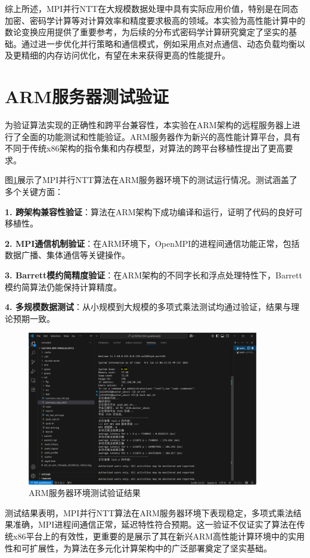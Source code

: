 \documentclass[a4paper]{article}
\begin{document}
\vspace{0.5em}
综上所述，MPI并行NTT在大规模数据处理中具有实际应用价值，特别是在同态加密、密码学计算等对计算效率和精度要求极高的领域。本实验为高性能计算中的数论变换应用提供了重要参考，为后续的分布式密码学计算研究奠定了坚实的基础。通过进一步优化并行策略和通信模式，例如采用点对点通信、动态负载均衡以及更精细的内存访问优化，有望在未来获得更高的性能提升。

\newpage
\appendix
\section{ARM服务器测试验证}

为验证算法实现的正确性和跨平台兼容性，本实验在ARM架构的远程服务器上进行了全面的功能测试和性能验证。ARM服务器作为新兴的高性能计算平台，具有不同于传统x86架构的指令集和内存模型，对算法的跨平台移植性提出了更高要求。

图\ref{fig:server_test}展示了MPI并行NTT算法在ARM服务器环境下的测试运行情况。测试涵盖了多个关键方面：

\textbf{1. 跨架构兼容性验证}：算法在ARM架构下成功编译和运行，证明了代码的良好可移植性。

\textbf{2. MPI通信机制验证}：在ARM环境下，OpenMPI的进程间通信功能正常，包括数据广播、集体通信等关键操作。

\textbf{3. Barrett模约简精度验证}：在ARM架构的不同字长和浮点处理特性下，Barrett模约简算法仍能保持计算精度。

\textbf{4. 多规模数据测试}：从小规模到大规模的多项式乘法测试均通过验证，结果与理论预期一致。

\begin{figure}[H]
    \centering
    \includegraphics[width=0.9\textwidth]{fig/test.png}
    \caption{ARM服务器环境测试验证结果}
    \label{fig:server_test}
\end{figure}

测试结果表明，MPI并行NTT算法在ARM服务器环境下表现稳定，多项式乘法结果准确，MPI进程间通信正常，延迟特性符合预期。这一验证不仅证实了算法在传统x86平台上的有效性，更重要的是展示了其在新兴ARM高性能计算环境中的实用性和可扩展性，为算法在多元化计算架构中的广泛部署奠定了坚实基础。

% 
%  
\end{document}
